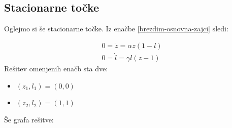 \documentclass[slovene,11pt,a4paper]{article}
\numberwithin{equation}{section} %
\numberwithin{figure}{section} %
\numberwithin{table}{section} %
\begin{document}
\subsection{Stacionarne točke}
Oglejmo si še stacionarne točke. Iz enačbe \ref{brezdim-osnovna-zajci} sledi:

\begin{equation}
\label{brezdim-stacionarne-zajci}
\begin{aligned}
0=\dot{z}=\alpha z(1-l) \\
0=\dot{l} = \gamma l(z-1)
\end{aligned}
\end{equation}
Rešitev omenjenih enačb sta dve:
\begin{itemize}
\item $(z_1,l_1)=(0,0)$
\item $(z_2,l_2)=(1,1)$
\end{itemize}
Še grafa rešitve:
\end{document}
